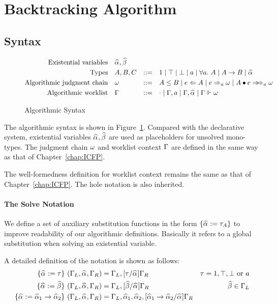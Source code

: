 
\section{Backtracking Algorithm}

\subsection{Syntax}

\begin{figure}[ht]
    \begin{gather*}
    \begin{aligned}
        \text{Existential variables}\quad&\al, \bt\\
        \text{Types}\quad&A, B, C &::=&\quad 1 \mid \top \mid \bot \mid a \mid \all A \mid A\to B \mid \al\\
        \text{Algorithmic judgment chain}\quad&\jg &::=&\quad A \le B \mid e\Lto A \mid e\To_{a} \jg \mid \appInfAlg{A}{e}\\
        \text{Algorithmic worklist}\quad&\Gm &::=&\quad \cdot \mid \Gm, a \mid \Gm, \al \mid \Gm \Vdash \jg
    \end{aligned}
    \end{gather*}
\caption{Algorithmic Syntax}\label{fig:top_alg_syntax}
\end{figure}

The algorithmic syntax is shown in Figure~\ref{fig:top_alg_syntax}.
Compared with the declarative system, existential variables $\al, \bt$ are used
as placeholders for unsolved mono-types.
The judgment chain $\omega$ and worklist context $\Gamma$ are defined in the same way as that of Chapter~\ref{chap:ICFP}.

The well-formedness definition for worklist context remains
the same as that of Chapter~\ref{chap:ICFP}.
The hole notation is also inherited.

\paragraph{The Solve Notation}
We define a set of auxiliary substitution functions in the form $\{\al := \tau_A\}$
to improve readability of our algorithmic definitions.
Basically it refers to a global substitution when solving an existential variable.

A detailed definition of the notation is shown as follows:
\begin{gather*}
    \begin{aligned}
        \{\al := \tau\}~(\Gm_L, \al, \Gm_R) &= \Gm_L, [\tau/\al]\Gm_R & \tau = 1, \top, \bot \text{ or }a\\
        \{\al := \bt\}~(\Gm_L, \al, \Gm_R) &= \Gm_L, [\bt/\al]\Gm_R & \bt \in \Gm_L\\
        \{\al := \al[1] \to \al[2]\}~(\Gm_L, \al, \Gm_R) &= \Gm_L, \al[1], \al[2], [\al[1] \to \al[2]/\al]\Gm_R\\
    \end{aligned}
\end{gather*}

